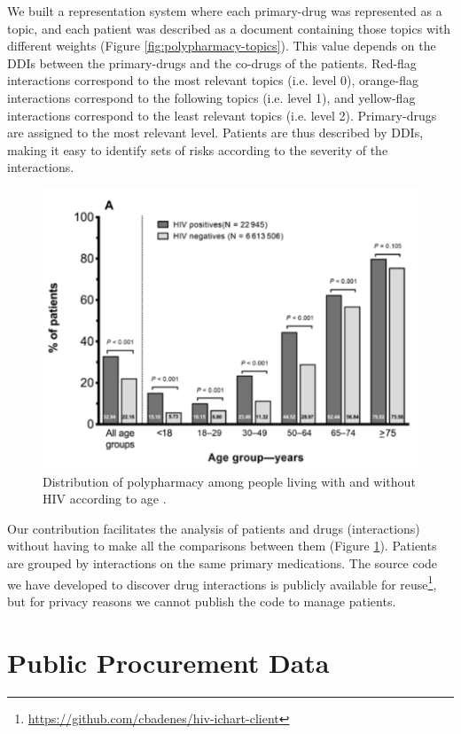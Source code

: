 We built a representation system where each primary-drug was represented as a topic, and each patient was described as a document containing those topics with different weights (Figure \ref{fig:polypharmacy-topics}). This value depends on the DDIs between the primary-drugs and the co-drugs of the patients. Red-flag interactions correspond to the most relevant topics (i.e. level 0), orange-flag interactions correspond to the following topics (i.e. level 1), and yellow-flag interactions correspond to the least relevant topics (i.e. level 2). Primary-drugs are assigned to the most relevant level. Patients are thus described by DDIs, making it easy to identify sets of risks according to the severity of the interactions.


\begin{figure}[!htbp]\centering
  \center
  \includegraphics[scale=0.4]{polypharmacy01.png}
  \caption{Distribution of polypharmacy among people living with and without HIV according to age \citep{Badenes-Olmedo2019c}.}
  \label{fig:polypharmacy}
\end{figure}

Our contribution facilitates the analysis of patients and drugs (interactions) without having to make all the comparisons between them (Figure \ref{fig:polypharmacy}). Patients are grouped by interactions on the same primary medications. The source code we have developed to discover drug interactions is publicly available for reuse\footnote{\url{https://github.com/cbadenes/hiv-ichart-client}}, but for privacy reasons we cannot publish the code to manage patients. 

\section{Public Procurement Data}
\label{sec:tbfy}

